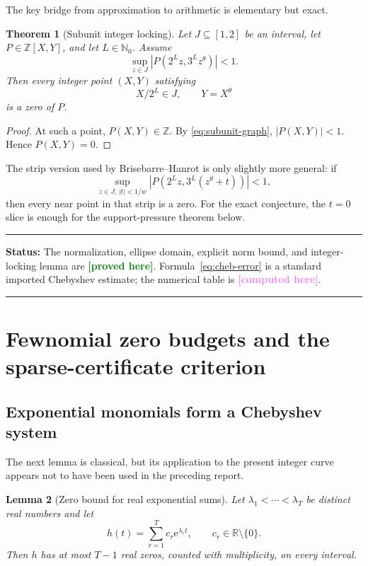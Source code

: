 \documentclass[11pt,oneside]{article}
\newtheorem{theorem}{Theorem}[section]
\newtheorem{lemma}[theorem]{Lemma}
\theoremstyle{definition}
\theoremstyle{remark}
\newcommand{\Nzero}{\mathbb N_0}
\newcommand{\Z}{\mathbb Z}
\newcommand{\R}{\mathbb R}
\newcommand{\ee}{\mathrm e}
\newcommand{\tht}{\theta}
\newcommand{\statusproved}{\textcolor{green}{\textbf{[proved here]}}}
\newcommand{\statuscomputed}{\textcolor{violet}{\textbf{[computed here]}}}
\newenvironment{statusbox}[1]
{\begin{center}\begin{minipage}{0.95\textwidth}\raggedright\hrule
\vspace{0.45em}\textbf{Status:} #1\par\vspace{0.35em}}
{\vspace{0.35em}\hrule\end{minipage}\end{center}}
\begin{document}
The key bridge from approximation to arithmetic is elementary but exact.

\begin{theorem}[Subunit integer locking]
\label{thm:integer-locking}
Let $J\subseteq[1,2]$ be an interval, let $P\in\Z[X,Y]$, and let $L\in\Nzero$.
Assume
\begin{equation}
  \sup_{z\in J}\left|P(2^Lz,3^Lz^\tht)\right|<1.
  \label{eq:subunit-graph}
\end{equation}
Then every integer point $(X,Y)$ satisfying
\[
  X/2^L\in J,\qquad Y=X^\tht
\]
is a zero of $P$.
\end{theorem}

\begin{proof}
At such a point, $P(X,Y)\in\Z$.  By \eqref{eq:subunit-graph}, $|P(X,Y)|<1$.  Hence $P(X,Y)=0$.
\end{proof}

The strip version used by Brisebarre--Hanrot is only slightly more general: if
\[
 \sup_{z\in J,\,|t|<1/w}
 \left|P(2^Lz,3^L(z^\tht+t))\right|<1,
\]
then every near point in that strip is a zero.  For the exact conjecture, the $t=0$ slice is enough
for the support-pressure theorem below.

\begin{statusbox}{The normalization, ellipse domain, explicit norm bound, and integer-locking
lemma are \statusproved.  Formula~\eqref{eq:cheb-error} is a standard imported Chebyshev estimate;
the numerical table is \statuscomputed.}
\end{statusbox}

\section{Fewnomial zero budgets and the sparse-certificate criterion}
\label{sec:fewnomial}

\subsection{Exponential monomials form a Chebyshev system}

The next lemma is classical, but its application to the present integer curve appears not to have
been used in the preceding report.

\begin{lemma}[Zero bound for real exponential sums]
\label{lem:exp-zero}
Let $\lambda_1<\cdots<\lambda_T$ be distinct real numbers and let
\[
  h(t)=\sum_{r=1}^T c_r\ee^{\lambda_rt},\qquad c_r\in\R\setminus\{0\}.
\]
Then $h$ has at most $T-1$ real zeros, counted with multiplicity, on every interval.
\end{lemma}
\end{document}
